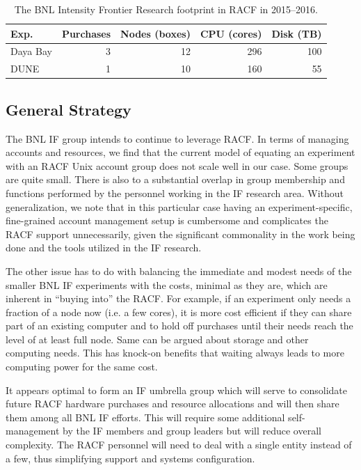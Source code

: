\documentclass[pdftex,12pt,letter]{article}
\begin{document}
\begin{table}[tbh]
\centering
\begin{tabular}[h]{|l|r|r|r|r|}
  \hline
  Exp. & Purchases & Nodes (boxes) & CPU (cores) & Disk (TB) \\
  \hline
  Daya Bay & 3 & 12 & 296 & 100 \\
  \hline
  DUNE & 1 & 10 & 160 & 55 \\
  \hline
\end{tabular}
\caption{The BNL Intensity Frontier Research footprint in RACF in 2015--2016.}
\label{tab:bnlif_at_racf_2016}

\end{table}

\subsection{General Strategy}

The BNL IF group intends to continue to leverage RACF. In terms of managing accounts and resources,
we find that the current model of equating an experiment with an RACF Unix account group does not
scale well in our case. Some groups are quite small. There is also to a substantial overlap in group membership
and functions performed by the personnel working in the IF research area.
Without generalization, we note that in this particular case having an experiment-specific,
fine-grained account management setup is cumbersome and complicates the RACF support unnecessarily,
given the significant commonality in the work being done and the tools utilized in the IF research.

The other issue has to do with balancing the immediate and modest needs of
the smaller BNL IF experiments with the costs, minimal as they are, which are
inherent in ``buying into'' the RACF. For example, if an experiment only needs a fraction of a node now (i.e. a few cores),
it is more cost efficient if they can share part of an existing computer and to hold
off purchases until their needs reach the level of at least full node.
Same can be argued about storage and other computing needs.
This has knock-on benefits that waiting always leads to more computing
power for the same cost.

It appears optimal to form an IF umbrella group which will serve to consolidate future RACF hardware purchases
and resource allocations and will then share them among all BNL IF efforts. This will require some additional
self-management by the IF members and group leaders but will reduce overall complexity. The RACF personnel
will need to deal with a single entity instead of a few, thus simplifying support and systems configuration.
\end{document}
